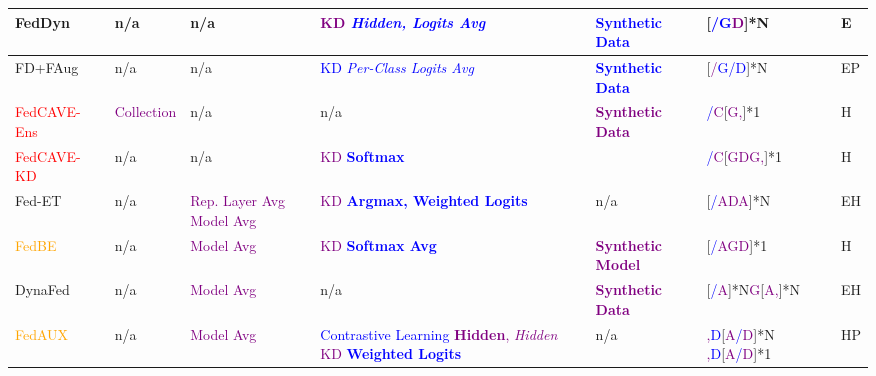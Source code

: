 \begin{table}[htp]
\begin{longtable}{|p{1.68cm}|p{1.2cm}|p{1.25cm}|p{5.0cm}|p{2.59cm}|p{1.2cm}|p{0.35cm}|}
    \rowcolor[gray]{.9}
    FedDyn~\cite{jin2023feddyn} & n/a & n/a & \textcolor{purple}{KD} \textcolor{blue}{\textit{Hidden, Logits Avg}} & \textcolor{blue}{\textbf{Synthetic Data}} & [\textcolor{blue}{/G}\textcolor{purple}{D}]*N & E \\ \hline

    FD+FAug~\cite{jeong2018communication} & n/a & n/a & \textcolor{blue}{KD} \textcolor{blue}{\textit{Per-Class Logits Avg}} & \textcolor{blue}{\textbf{Synthetic Data}} & [\textcolor{purple}{/}\textcolor{blue}{G}\textcolor{blue}{/D}]*N & EP \\ \hline

    \rowcolor[gray]{.9}
    \textcolor{red}{FedCAVE-Ens}~\cite{heinbaugh2023data} & \textcolor{purple}{Collection}  & n/a & n/a & \textcolor{purple}{\textbf{Synthetic Data}} & \textcolor{blue}{/}\textcolor{purple}{C}[\textcolor{purple}{G,}]*1 & H \\
    \rowcolor[gray]{.9}
    \textcolor{red}{FedCAVE-KD}~\cite{heinbaugh2023data} & n/a & n/a & \textcolor{purple}{KD} \textcolor{blue}{\textbf{Softmax}} & & \textcolor{blue}{/}\textcolor{purple}{C}[\textcolor{purple}{GDG,}]*1 & H \\ \hline

    Fed-ET~\cite{cho2022heterogeneous} & n/a & \textcolor{purple}{Rep. Layer Avg} \newline \textcolor{purple}{Model Avg} & \textcolor{purple}{KD} \textcolor{blue}{\textbf{Argmax, Weighted Logits}} & n/a & [\textcolor{blue}{/}\textcolor{purple}{ADA}]*N & EH \\ \hline

    \rowcolor[gray]{.9}
    \textcolor{orange}{FedBE}~\cite{chen2020fedbe} & n/a & \textcolor{purple}{Model Avg} & \textcolor{purple}{KD} \textcolor{blue}{\textbf{Softmax Avg}} & \textcolor{purple}{\textbf{Synthetic Model}} & [\textcolor{blue}{/}\textcolor{purple}{AGD}]*1 & H \\ \hline %

    DynaFed~\cite{pi2022dynafed} & n/a & \textcolor{purple}{Model Avg} & n/a & \textcolor{purple}{\textbf{Synthetic Data}} & [\textcolor{blue}{/}\textcolor{purple}{A}]*N\textcolor{purple}{G}[\textcolor{purple}{A,}]*N & EH \\ \hline

    \rowcolor[gray]{.9}
    \textcolor{orange}{FedAUX}~\cite{sattler2021fedaux} & n/a & \textcolor{purple}{Model Avg} & \textcolor{blue}{Contrastive Learning} \textcolor{purple}{\textbf{Hidden}, \textit{Hidden}} \newline \textcolor{purple}{KD} \textcolor{blue}{\textbf{Weighted Logits}} & n/a & \textcolor{purple}{,}\textcolor{blue}{D}[\textcolor{purple}{A\textcolor{blue}{/}D}]*N \newline \textcolor{purple}{,}\textcolor{blue}{D}[\textcolor{purple}{A\textcolor{blue}{/}D}]*1 & HP \\ \hline %
    

\end{longtable}
\end{table}
